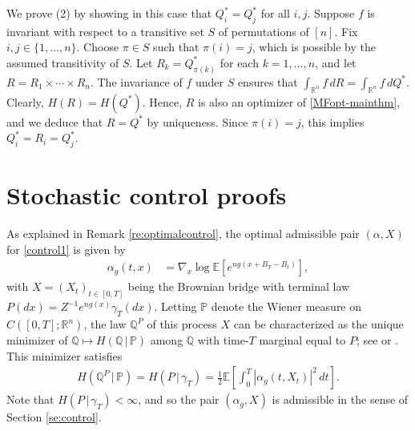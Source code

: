 \documentclass[11pt,reqno]{amsart}
\numberwithin{equation}{section}
\theoremstyle{definition}
\def\E{{\mathbb E}}
\def\R{{\mathbb R}}
\def\PP{{\mathbb P}}
\def\QQ{{\mathbb Q}}
\begin{document}
We prove (2) by showing in this case that $Q^*_i=Q^*_j$ for all $i,j$. Suppose $f$ is invariant with respect to a transitive set $S$ of permutations of $[n]$. Fix $i,j \in \{1,\ldots,n\}$. Choose $\pi \in S$ such that $\pi(i)=j$, which is possible by the assumed transitivity of $S$. Let $R_k=Q^*_{\pi(k)}$ for each $k=1,\ldots,n$, and let $R = R_1 \times \cdots \times R_n$. The invariance of $f$ under $S$ ensures that $\int_{\R^n} f\,dR = \int_{\R^n} f\,dQ^*$.  Clearly, $H(R)=H(Q^*)$.  Hence, $R$ is also an optimizer of \eqref{MFopt-mainthm}, and we deduce that $R=Q^*$ by uniqueness. Since $\pi(i)=j$, this implies  $Q^*_i=R_i=Q^*_j$. 


\section{Stochastic control proofs} \label{se:control-proofs}


As explained in Remark \ref{re:optimalcontrol}, the optimal admissible pair $(\alpha,X)$ for \eqref{control1} is given by
\begin{align}
	\alpha_g(t,x) &= \nabla_x \log \E[e^{n g(x+B_T-B_t)}], \label{Follmerdrift}
\end{align}
with $X=(X_t)_{t \in [0,T]}$ being the Brownian bridge with terminal law $P(dx)=Z^{-1}e^{ng(x)}\gamma_T(dx)$.
Letting $\PP$ denote the Wiener measure on $C([0,T];\R^n)$, the law $\QQ^P$ of this process $X$ can be characterized as the unique minimizer of $\QQ \mapsto H(\QQ\,|\,\PP)$ among $\QQ$ with time-$T$ marginal equal to $P$; see \cite[Proposition 6]{baudoin2002conditioned} or \cite[Lemma 10]{lehec2013representation}. This minimizer satisfies
\begin{align} \label{eq: entropy.minimizer}
	H(\QQ^P \, | \, \PP) =  H(P \, | \, \gamma_T) = \frac{1}{2}\E \left[\int_0^T |\alpha_g(t, X_t)|^2 \, dt\right].
\end{align}
Note that $H(P\,|\,\gamma_T) < \infty$, and so the pair $(\alpha_g,X)$ is admissible in the sense of Section \ref{se:control}.
\end{document}
